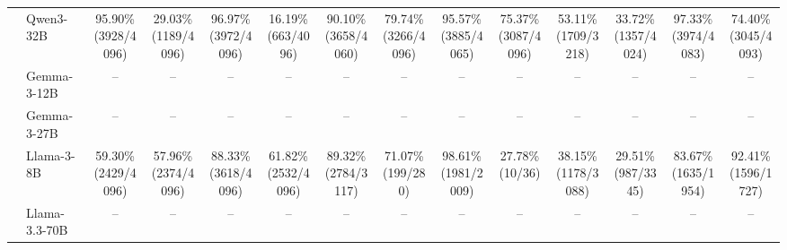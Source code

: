 \begin{table}[t]
{\begin{tabular}{ll*{12}{c}}
 & Qwen3-32B & \makecell[c]{95.90\%\\[-1pt]\scriptsize(3928/4096)} & \makecell[c]{29.03\%\\[-1pt]\scriptsize(1189/4096)} & \makecell[c]{96.97\%\\[-1pt]\scriptsize(3972/4096)} & \makecell[c]{16.19\%\\[-1pt]\scriptsize(663/4096)} & \makecell[c]{90.10\%\\[-1pt]\scriptsize(3658/4060)} & \makecell[c]{79.74\%\\[-1pt]\scriptsize(3266/4096)} & \makecell[c]{95.57\%\\[-1pt]\scriptsize(3885/4065)} & \makecell[c]{75.37\%\\[-1pt]\scriptsize(3087/4096)} & \makecell[c]{53.11\%\\[-1pt]\scriptsize(1709/3218)} & \makecell[c]{33.72\%\\[-1pt]\scriptsize(1357/4024)} & \makecell[c]{97.33\%\\[-1pt]\scriptsize(3974/4083)} & \makecell[c]{74.40\%\\[-1pt]\scriptsize(3045/4093)} \\
 & Gemma-3-12B & -- & -- & -- & -- & -- & -- & -- & -- & -- & -- & -- & -- \\
 & Gemma-3-27B & -- & -- & -- & -- & -- & -- & -- & -- & -- & -- & -- & -- \\
 & Llama-3-8B & \makecell[c]{59.30\%\\[-1pt]\scriptsize(2429/4096)} & \makecell[c]{57.96\%\\[-1pt]\scriptsize(2374/4096)} & \makecell[c]{88.33\%\\[-1pt]\scriptsize(3618/4096)} & \makecell[c]{61.82\%\\[-1pt]\scriptsize(2532/4096)} & \makecell[c]{89.32\%\\[-1pt]\scriptsize(2784/3117)} & \makecell[c]{71.07\%\\[-1pt]\scriptsize(199/280)} & \makecell[c]{98.61\%\\[-1pt]\scriptsize(1981/2009)} & \makecell[c]{27.78\%\\[-1pt]\scriptsize(10/36)} & \makecell[c]{38.15\%\\[-1pt]\scriptsize(1178/3088)} & \makecell[c]{29.51\%\\[-1pt]\scriptsize(987/3345)} & \makecell[c]{83.67\%\\[-1pt]\scriptsize(1635/1954)} & \makecell[c]{92.41\%\\[-1pt]\scriptsize(1596/1727)} \\
 & Llama-3.3-70B & -- & -- & -- & -- & -- & -- & -- & -- & -- & -- & -- & -- \\

\end{tabular}}
\end{table}
